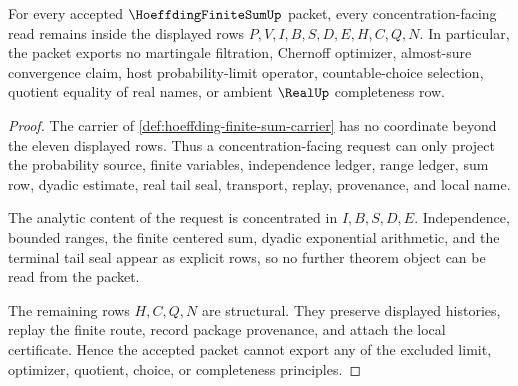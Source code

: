 \begin{theorem}\label{thm:hoeffding-finite-sum-nonescape}
For every accepted $\HoeffdingFiniteSumUp$ packet, every concentration-facing read remains inside the displayed rows $P,V,I,B,S,D,E,H,C,Q,N$. In particular, the packet exports no martingale filtration, Chernoff optimizer, almost-sure convergence claim, host probability-limit operator, countable-choice selection, quotient equality of real names, or ambient $\RealUp$ completeness row.
\end{theorem}
\begin{proof}
The carrier of \autoref{def:hoeffding-finite-sum-carrier} has no coordinate beyond the eleven displayed rows. Thus a concentration-facing request can only project the probability source, finite variables, independence ledger, range ledger, sum row, dyadic estimate, real tail seal, transport, replay, provenance, and local name.

The analytic content of the request is concentrated in $I,B,S,D,E$. Independence, bounded ranges, the finite centered sum, dyadic exponential arithmetic, and the terminal tail seal appear as explicit rows, so no further theorem object can be read from the packet.

The remaining rows $H,C,Q,N$ are structural. They preserve displayed histories, replay the finite route, record package provenance, and attach the local certificate. Hence the accepted packet cannot export any of the excluded limit, optimizer, quotient, choice, or completeness principles.
\end{proof}

\begin{closurestatus}{\HoeffdingFiniteSumUp}
  \theoryclosure{\seedClosure}
  \formalstatus{\unformalizedV}
\end{closurestatus}

